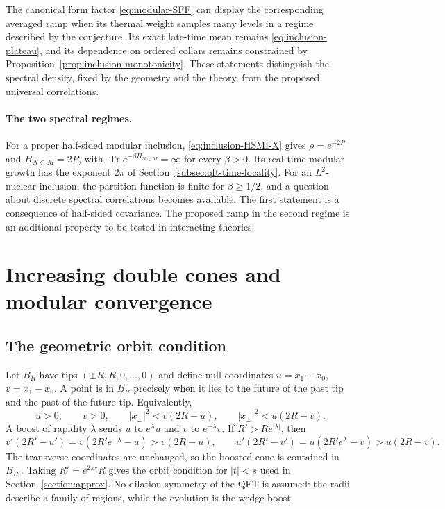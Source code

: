 \documentclass[a4paper,11pt]{article}
\theoremstyle{definition}
\begin{document}
The canonical form factor \eqref{eq:modular-SFF} can display the corresponding averaged ramp when its thermal weight samples many levels in a regime described by the conjecture. Its exact late-time mean remains \eqref{eq:inclusion-plateau}, and its dependence on ordered collars remains constrained by Proposition~\ref{prop:inclusion-monotonicity}. These statements distinguish the spectral density, fixed by the geometry and the theory, from the proposed universal correlations.

\paragraph{The two spectral regimes.}
For a proper half-sided modular inclusion, \eqref{eq:inclusion-HSMI-X} gives $\rho=e^{-2P}$ and $H_{N\subset M}=2P$, with $\operatorname{Tr}e^{-\beta H_{N\subset M}}=\infty$ for every $\beta>0$. Its real-time modular growth has the exponent $2\pi$ of Section~\ref{subsec:qft-time-locality}. For an $L^2$-nuclear inclusion, the partition function is finite for $\beta\ge1/2$, and a question about discrete spectral correlations becomes available. The first statement is a consequence of half-sided covariance. The proposed ramp in the second regime is an additional property to be tested in interacting theories.








\section{Increasing double cones and modular convergence}\label{app:increasing}

\subsection{The geometric orbit condition}\label{app:orbit}

Let $B_R$ have tips $(\pm R,R,0,\ldots,0)$ and define null coordinates $u=x_1+x_0$, $v=x_1-x_0$. A point is in $B_R$ precisely when it lies to the future of the past tip and the past of the future tip. Equivalently,
\begin{equation}
 u>0,\qquad v>0,\qquad |x_\perp|^2<v(2R-u),\qquad |x_\perp|^2<u(2R-v).
 \label{eq:appA-cone}
\end{equation}
A boost of rapidity $\lambda$ sends $u$ to $e^\lambda u$ and $v$ to $e^{-\lambda}v$. If $R'>Re^{|\lambda|}$, then
\begin{equation}
 v'(2R'-u')=v(2R'e^{-\lambda}-u)>v(2R-u),\qquad
 u'(2R'-v')=u(2R'e^{\lambda}-v)>u(2R-v).
 \label{eq:appA-boosted}
\end{equation}
The transverse coordinates are unchanged, so the boosted cone is contained in $B_{R'}$. Taking $R'=e^{2\pi s}R$ gives the orbit condition for $|t|<s$ used in Section~\ref{section:approx}. No dilation symmetry of the QFT is assumed: the radii describe a family of regions, while the evolution is the wedge boost.
\end{document}
